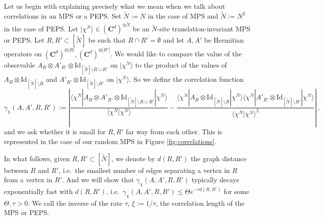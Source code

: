 \documentclass{amsart}
\newcommand{\C}{\mathbf{C}}
\renewcommand{\leq}{\leqslant}
\newcommand{\Id}{\mathrm{Id}}
\newcommand{\braket}[2]{\langle #1 | #2\rangle}
\newcommand{\bra}[1]{\langle #1 |}
\newcommand{\ket}[1]{| #1 \rangle}
\begin{document}
Let us begin with explaining precisely what we mean when we talk about correlations in an MPS or a PEPS. Set $\tilde{N}:=N$ in the case of MPS and $\tilde{N}:=N^2$ in the case of PEPS. Let $\ket{\chi^{N}}\in(\C^d)^{\otimes \tilde{N}}$ be an $\tilde{N}$-site translation-invariant MPS or PEPS. Let $R,R'\subset[\tilde{N}]$ be such that $R\cap R'=\emptyset$ and let $A,A'$ be Hermitian operators on $(\C^d)^{\otimes |R|},(\C^d)^{\otimes |R'|}$. We would like to compare the value of the observable $A_{R}\otimes A'_{R'}\otimes\Id_{[\tilde{N}]\setminus R\cup R'}$ on $\ket{\chi^{N}}$ to the product of the values of $A_{R}\otimes\Id_{[\tilde{N}]\setminus R}$ and $A'_{R'}\otimes\Id_{[\tilde{N}]\setminus R'}$ on $\ket{\chi^{N}}$. So we define the correlation function
\begin{equation} \label{eq:def-C}
    \gamma_{\chi}(A,A',R,R') := \left| \frac{\bra{\chi^{N}} A_{R}\otimes A'_{R'}\otimes\Id_{[\tilde{N}]\setminus R\cup R'} \ket{\chi^{N}}}{\braket{\chi^{N}}{\chi^{N}}} - \frac{\bra{\chi^{N}} A_{R}\otimes\Id_{[\tilde{N}]\setminus R} \ket{\chi^{N}} \bra{\chi^{N}} A'_{R'}\otimes\Id_{[\tilde{N}]\setminus R'} \ket{\chi^{N}}}{\braket{\chi^{N}}{\chi^{N}}^2} \right| \, ,
\end{equation}
and we ask whether it is small for $R,R'$ far way from each other. This is represented in the case of our random MPS in Figure \ref{fig:correlations}.

In what follows, given $R,R'\subset[\tilde{N}]$, we denote by $d(R,R')$ the graph distance between $R$ and $R'$, i.e.~the smallest number of edges separating a vertex in $R$ from a vertex in $R'$. And we will show that $\gamma_{\chi}(A,A',R,R')$ typically decays exponentially fast with $d(R,R')$, i.e.~$\gamma_{\chi}(A,A',R,R')\leq \Theta e^{-\tau d(R,R')}$ for some $\Theta,\tau>0$. We call the inverse of the rate $\tau$, $\xi:=1/\tau$, the correlation length of the MPS or PEPS.
\end{document}

